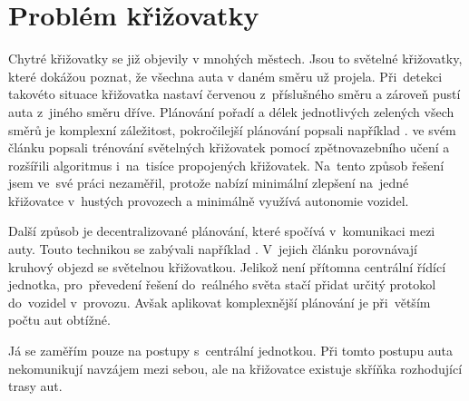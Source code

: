 \section{Problém křižovatky}\label{sec:problem}

%


Chytré křižovatky se již objevily v mnohých městech.
Jsou to světelné křižovatky, které dokážou poznat, že všechna auta v daném směru už projela.
Při~detekci takovéto situace křižovatka nastaví červenou z~příslušného směru a zároveň pustí auta z~jiného směru dříve.
Plánování pořadí a délek jednotlivých zelených všech směrů je komplexní záležitost, pokročilejší plánování popsali například \citet*{Goldstein}.
\citet*{Liang} ve svém článku popsali trénování světelných křižovatek pomocí zpětnovazebního učení
a rozšířili algoritmus i~na~tisíce propojených křižovatek.
Na~tento způsob řešení jsem ve~své práci nezaměřil, protože nabízí minimální zlepšení
na~jedné křižovatce v~hustých provozech a minimálně využívá autonomie vozidel.

Další způsob je decentralizované plánování, které spočívá v~komunikaci mezi auty.
Touto technikou se zabývali například \citet*{Wu}.
V~jejich článku porovnávají kruhový objezd se světelnou křižovatkou.
Jelikož není přítomna centrální řídící jednotka, pro~převedení řešení
do~reálného světa stačí přidat určitý protokol do~vozidel v~provozu.
Avšak aplikovat komplexnější plánování je při~větším počtu aut obtížné.

Já se zaměřím pouze na postupy s~centrální jednotkou.
Při tomto postupu auta nekomunikují navzájem mezi sebou, ale na křižovatce existuje skříňka rozhodující trasy aut.


